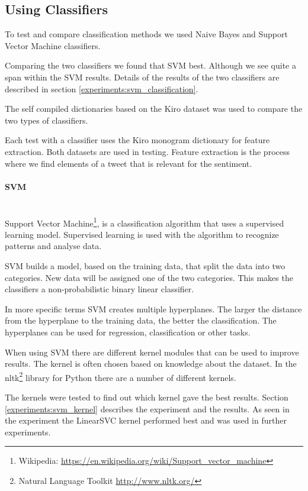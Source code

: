 \subsection{Using Classifiers}\label{sentiment:classifier_classification}
To test and compare classification methods we used Naive Bayes and
Support Vector Machine classifiers. 

Comparing the two classifiers we found that SVM best. Although we see quite a
span within the SVM results. Details of the results of the two classifiers are
described in section \ref{experiments:svm_classification}. 

The self compiled dictionaries based on the Kiro dataset was used to compare
the two types of classifiers. 

Each test with a classifier uses the Kiro monogram dictionary for feature
extraction. Both datasets are used in testing.
Feature extraction is the process where we find elements of a tweet that is
relevant for the sentiment.  

\paragraph{SVM}\label{sentiment:svm_classification}
\hspace{0pt}\\
Support Vector Machine\footnote{Wikipedia:
\url{https://en.wikipedia.org/wiki/Support_vector_machine}}, is a classification
algorithm that uses a supervised learning model. Supervised learning is used
with the algorithm to recognize patterns and analyse data. 

SVM builds a model, based on the training data, that split the data into two
categories. New data will be assigned one of the two categories. This makes the
classifiers a non-probabilistic binary linear classifier. 

In more specific terms SVM creates multiple hyperplanes. The larger the
distance from the hyperplane to the training data, the better the
classification. The hyperplanes can be used for regression, classification or
other tasks. 

When using SVM there are different kernel modules that can be used
to improve results. The kernel is often chosen based on knowledge about the
dataset. In the nltk\footnote{Natural Language Toolkit
\url{http://www.nltk.org/}} library for Python there are a number of different
kernels. 

The kernels were tested to find out which kernel gave the best results. Section
\ref{experiments:svm_kernel} describes the experiment and the results. As
seen in the experiment the LinearSVC kernel performed best and was used in
further experiments.
%

